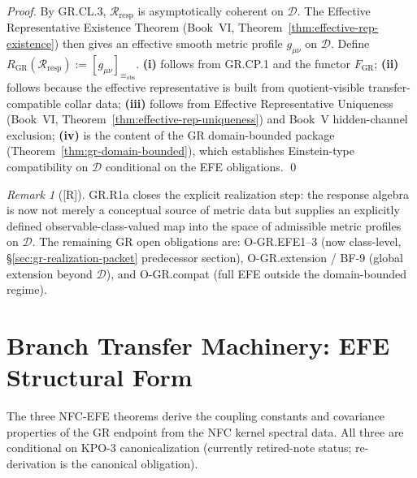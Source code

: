 \documentclass[12pt,oneside]{amsbook}
\theoremstyle{plain}
\theoremstyle{definition}
\theoremstyle{remark}
\newtheorem{remark}[theorem]{Remark}
\newcommand{\status}[1]{\textup{[#1]}}
\begin{document}
\begin{proof}
By GR.CL.3, $\mathcal{R}_{\mathrm{resp}}$ is asymptotically
coherent on $\mathcal{D}$. The Effective Representative Existence
Theorem (Book~VI, Theorem~\ref{thm:effective-rep-existence}) then
gives an effective smooth metric profile $g_{\mu\nu}$ on
$\mathcal{D}$. Define $R_{\mathrm{GR}}(\mathcal{R}_{\mathrm{resp}})
:= [g_{\mu\nu}]_{\equiv_{\mathrm{obs}}}$.
\textbf{(i)} follows from GR.CP.1 and the functor $F_{\mathrm{GR}}$;
\textbf{(ii)} follows because the effective representative is
built from quotient-visible transfer-compatible collar data;
\textbf{(iii)} follows from Effective Representative Uniqueness
(Book~VI, Theorem~\ref{thm:effective-rep-uniqueness}) and Book~V
hidden-channel exclusion;
\textbf{(iv)} is the content of the GR domain-bounded package
(Theorem~\ref{thm:gr-domain-bounded}), which establishes
Einstein-type compatibility on $\mathcal{D}$ conditional on the
EFE obligations. \qed
\end{proof}

\begin{remark}[\status{R}]\label{rem:GR-R1a-honest}
GR.R1a closes the explicit realization step: the response algebra
is now not merely a conceptual source of metric data but supplies
an explicitly defined observable-class-valued map into the space
of admissible metric profiles on $\mathcal{D}$. The remaining GR
open obligations are: O-GR.EFE1--3 (now class-level, §\ref{sec:gr-realization-packet}
predecessor section), O-GR.extension / BF-9 (global extension
beyond $\mathcal{D}$), and O-GR.compat (full EFE outside the
domain-bounded regime).
\end{remark}

\section{Branch Transfer Machinery: EFE Structural Form}
\label{sec:transfer}

The three NFC-EFE theorems derive the coupling constants and
covariance properties of the GR endpoint from the NFC kernel
spectral data. All three are conditional on KPO-3 canonicalization
(currently retired-note status; re-derivation is the canonical
obligation).
\end{document}

